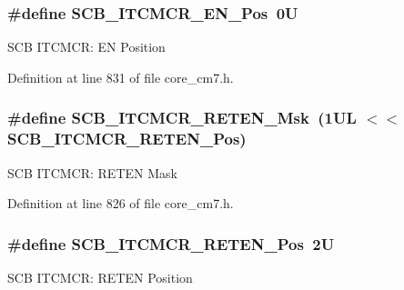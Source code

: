 \subsubsection[{\texorpdfstring{S\+C\+B\+\_\+\+I\+T\+C\+M\+C\+R\+\_\+\+E\+N\+\_\+\+Pos}{SCB_ITCMCR_EN_Pos}}]{\setlength{\rightskip}{0pt plus 5cm}\#define S\+C\+B\+\_\+\+I\+T\+C\+M\+C\+R\+\_\+\+E\+N\+\_\+\+Pos~0U}\hypertarget{group___c_m_s_i_s___s_c_b_ga5d2fc7c04a8aaedff19bd4ff6de187eb}{}\label{group___c_m_s_i_s___s_c_b_ga5d2fc7c04a8aaedff19bd4ff6de187eb}
S\+CB I\+T\+C\+M\+CR\+: EN Position 

Definition at line 831 of file core\+\_\+cm7.\+h.

\subsubsection[{\texorpdfstring{S\+C\+B\+\_\+\+I\+T\+C\+M\+C\+R\+\_\+\+R\+E\+T\+E\+N\+\_\+\+Msk}{SCB_ITCMCR_RETEN_Msk}}]{\setlength{\rightskip}{0pt plus 5cm}\#define S\+C\+B\+\_\+\+I\+T\+C\+M\+C\+R\+\_\+\+R\+E\+T\+E\+N\+\_\+\+Msk~(1\+U\+L $<$$<$ S\+C\+B\+\_\+\+I\+T\+C\+M\+C\+R\+\_\+\+R\+E\+T\+E\+N\+\_\+\+Pos)}\hypertarget{group___c_m_s_i_s___s_c_b_ga6f7d14ca4c78b7fd64157d9f8110f188}{}\label{group___c_m_s_i_s___s_c_b_ga6f7d14ca4c78b7fd64157d9f8110f188}
S\+CB I\+T\+C\+M\+CR\+: R\+E\+T\+EN Mask 

Definition at line 826 of file core\+\_\+cm7.\+h.

\subsubsection[{\texorpdfstring{S\+C\+B\+\_\+\+I\+T\+C\+M\+C\+R\+\_\+\+R\+E\+T\+E\+N\+\_\+\+Pos}{SCB_ITCMCR_RETEN_Pos}}]{\setlength{\rightskip}{0pt plus 5cm}\#define S\+C\+B\+\_\+\+I\+T\+C\+M\+C\+R\+\_\+\+R\+E\+T\+E\+N\+\_\+\+Pos~2U}\hypertarget{group___c_m_s_i_s___s_c_b_ga1094e5655c0e9572ecd562fa4a7d5f21}{}\label{group___c_m_s_i_s___s_c_b_ga1094e5655c0e9572ecd562fa4a7d5f21}
S\+CB I\+T\+C\+M\+CR\+: R\+E\+T\+EN Position 

